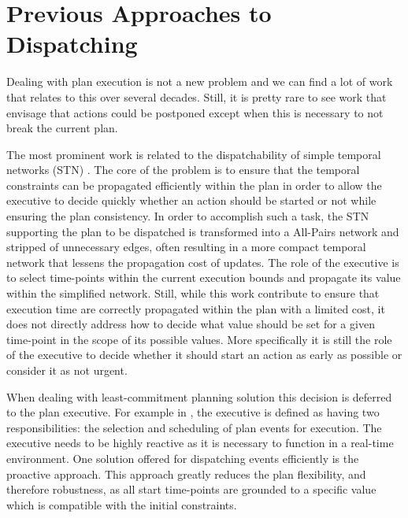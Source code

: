 \section{Previous Approaches to Dispatching}


Dealing with plan execution is not a new problem and we can find a lot
of work that relates to this over several decades. Still, it is
pretty rare to see work that envisage that actions could be
postponed except when this is necessary to not break the current
plan. 


The most prominent work is related to the dispatchability of simple 
temporal networks (STN) \cite{mus98a}. The core of the problem is to
ensure that the temporal constraints can be propagated efficiently
within the plan in order to allow the executive to decide quickly
whether an action should be started or not while ensuring the plan
consistency. In order to accomplish such a task, the STN supporting
the plan to be dispatched is transformed into a All-Pairs network and
stripped of unnecessary edges, often resulting in a more compact
temporal network that lessens the propagation cost of updates. The
role of the executive is to select time-points within the current
execution bounds and propagate its value within the simplified
network. Still, while this work contribute to ensure that execution
time are correctly propagated within the plan with a limited cost, it
does not directly address how to decide what value should be set for a
given time-point in the scope of its possible values. More specifically
it is still the role of the executive to decide whether it should
start an action as early as possible or consider it as not urgent. 

When dealing with least-commitment planning solution this decision is
deferred to the plan executive. For example in \cite{mus98c}, the 
executive is defined as having two responsibilities: the selection and scheduling of plan
events for execution. The executive needs to
be highly reactive as it is necessary to function in a real-time
environment. One solution offered for dispatching events efficiently
is the proactive approach. This approach greatly reduces the plan
flexibility, and therefore robustness, as all start time-points are
grounded to a specific value which is compatible with the initial
constraints. %

